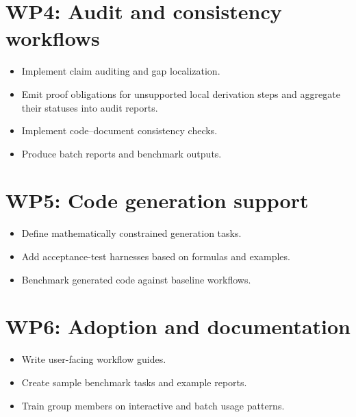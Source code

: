 \section*{WP4: Audit and consistency workflows}
\begin{itemize}
  \item Implement claim auditing and gap localization.
  \item Emit proof obligations for unsupported local derivation steps and aggregate their statuses into audit reports.
  \item Implement code--document consistency checks.
  \item Produce batch reports and benchmark outputs.
\end{itemize}

\section*{WP5: Code generation support}
\begin{itemize}
  \item Define mathematically constrained generation tasks.
  \item Add acceptance-test harnesses based on formulas and examples.
  \item Benchmark generated code against baseline workflows.
\end{itemize}

\section*{WP6: Adoption and documentation}
\begin{itemize}
  \item Write user-facing workflow guides.
  \item Create sample benchmark tasks and example reports.
  \item Train group members on interactive and batch usage patterns.
\end{itemize}

